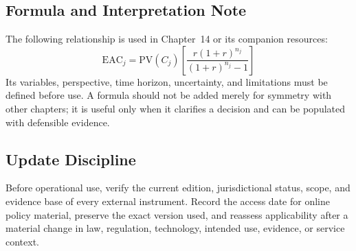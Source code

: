 \subsection{Formula and Interpretation Note}
The following relationship is used in Chapter~14 or its companion resources:
\begin{equation}
\mathrm{EAC}_j=\mathrm{PV}(C_j)\left[\frac{r(1+r)^{n_j}}{(1+r)^{n_j}-1}\right]
\label{eq:comp-ch14-reference-formula}
\end{equation}
Its variables, perspective, time horizon, uncertainty, and limitations must be
defined before use. A formula should not be added merely for symmetry with other
chapters; it is useful only when it clarifies a decision and can be populated with
defensible evidence.

\subsection{Update Discipline}
Before operational use, verify the current edition, jurisdictional status, scope,
and evidence base of every external instrument. Record the access date for online
policy material, preserve the exact version used, and reassess applicability after a
material change in law, regulation, technology, intended use, evidence, or service
context.
